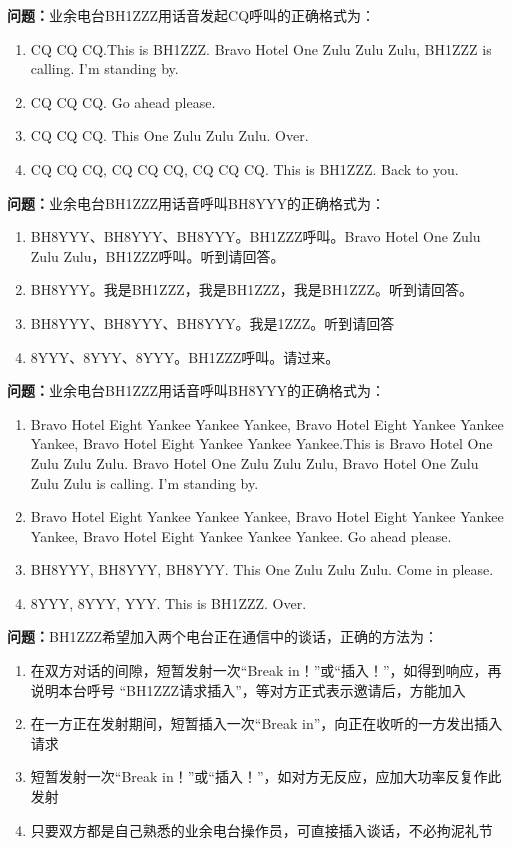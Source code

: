 \documentclass[UTF8]{ctexbook}
\begin{document}
\textbf{问题：}业余电台BH1ZZZ用话音发起CQ呼叫的正确格式为：
\begin{enumerate}[label=\Alph*), leftmargin=3em]
  \item CQ CQ CQ.This is BH1ZZZ. Bravo Hotel One Zulu Zulu Zulu, BH1ZZZ is calling. I’m standing by.
  \item CQ CQ CQ. Go ahead please.
  \item CQ CQ CQ. This One Zulu Zulu Zulu. Over.
  \item CQ CQ CQ, CQ CQ CQ, CQ CQ CQ. This is BH1ZZZ. Back to you.
\end{enumerate}

\textbf{问题：}业余电台BH1ZZZ用话音呼叫BH8YYY的正确格式为：
\begin{enumerate}[label=\Alph*), leftmargin=3em]
  \item BH8YYY、BH8YYY、BH8YYY。BH1ZZZ呼叫。Bravo Hotel One Zulu Zulu Zulu，BH1ZZZ呼叫。听到请回答。
  \item BH8YYY。我是BH1ZZZ，我是BH1ZZZ，我是BH1ZZZ。听到请回答。
  \item BH8YYY、BH8YYY、BH8YYY。我是1ZZZ。听到请回答
  \item 8YYY、8YYY、8YYY。BH1ZZZ呼叫。请过来。
\end{enumerate}

\textbf{问题：}业余电台BH1ZZZ用话音呼叫BH8YYY的正确格式为：
\begin{enumerate}[label=\Alph*), leftmargin=3em]
  \item Bravo Hotel Eight Yankee Yankee Yankee, Bravo Hotel Eight Yankee Yankee Yankee, Bravo Hotel Eight Yankee Yankee Yankee.This is Bravo Hotel One Zulu Zulu Zulu. Bravo Hotel One Zulu Zulu Zulu, Bravo Hotel One Zulu Zulu Zulu is calling. I’m standing by.
  \item Bravo Hotel Eight Yankee Yankee Yankee, Bravo Hotel Eight Yankee Yankee Yankee, Bravo Hotel Eight Yankee Yankee Yankee. Go ahead please.
  \item BH8YYY, BH8YYY, BH8YYY. This One Zulu Zulu Zulu. Come in please.
  \item 8YYY, 8YYY, YYY. This is BH1ZZZ. Over.
\end{enumerate}

\textbf{问题：}BH1ZZZ希望加入两个电台正在通信中的谈话，正确的方法为：
\begin{enumerate}[label=\Alph*), leftmargin=3em]
  \item 在双方对话的间隙，短暂发射一次“Break in！”或“插入！”，如得到响应，再说明本台呼号 “BH1ZZZ请求插入”，等对方正式表示邀请后，方能加入
  \item 在一方正在发射期间，短暂插入一次“Break in”，向正在收听的一方发出插入请求
  \item 短暂发射一次“Break in！”或“插入！”，如对方无反应，应加大功率反复作此发射
  \item 只要双方都是自己熟悉的业余电台操作员，可直接插入谈话，不必拘泥礼节
\end{enumerate}
\end{document}
